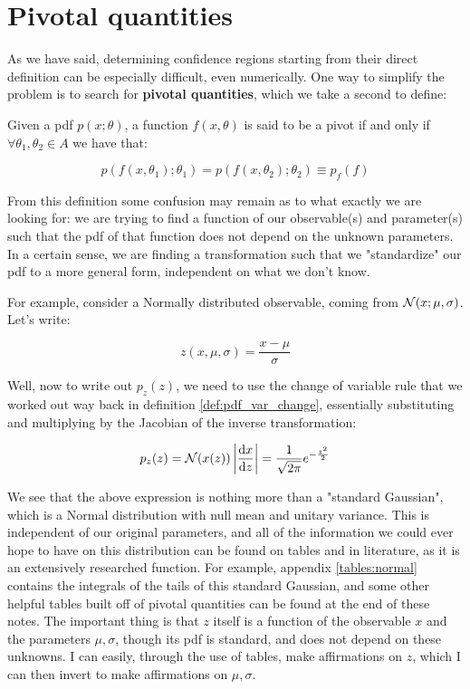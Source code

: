 \section{Pivotal quantities}
As we have said, determining confidence regions starting from their direct definition can be especially difficult, even numerically. One way to simplify the problem is to search for \textbf{pivotal quantities}, which we take a second to define:

\begin{definition}
	Given a pdf $p(x;\theta)$, a function $f(x,\theta)$ is said to be a pivot if and only if $\forall \theta_1,\theta_2\in A$ we have that:
	
	\[
	p\left(f(x,\theta_1);\theta_1\right) = p\left(f(x,\theta_2);\theta_2\right) \equiv p_f(f)
	\]
\end{definition}

From this definition some confusion may remain as to what exactly we are looking for: we are trying to find a function of our observable(s) and parameter(s) such that the pdf of that function does not depend on the unknown parameters. In a certain sense, we are finding a transformation such that we "standardize" our pdf to a more general form, independent on what we don't know. 

For example, consider a Normally distributed observable, coming from $\mathcal{N}(x;\mu,\sigma)$. Let's write:

	\[
	z\left(x,\mu,\sigma\right) = \frac{x-\mu}{\sigma}
	\]

Well, now to write out $p_z(z)$, we need to use the change of variable rule that we worked out way back in definition \ref{def:pdf_var_change}, essentially substituting and multiplying by the Jacobian of the inverse transformation:

	\[
	p_z(z) = \mathcal{N}(x(z))\left|\frac{\mathrm{d} x}{\mathrm{d} z}\right| = \frac{1}{\sqrt{2\pi}}e^{-\frac{z^2}{2}}
	\]

We see that the above expression is nothing more than a "standard Gaussian", which is a Normal distribution with null mean and unitary variance. This is independent of our original parameters, and all of the information we could ever hope to have on this distribution can be found on tables and in literature, as it is an extensively researched function. For example, appendix \ref{tables:normal} contains the integrals of the tails of this standard Gaussian, and some other helpful tables built off of pivotal quantities can be found at the end of these notes. The important thing is that $z$ itself is a function of the observable $x$ and the parameters $\mu,\sigma$, though its pdf is standard, and does not depend on these unknowns. I can easily, through the use of tables, make affirmations on $z$, which I can then invert to make affirmations on $\mu, \sigma$.

